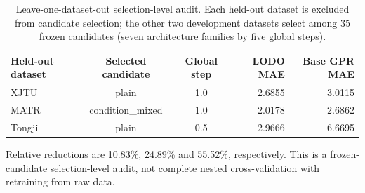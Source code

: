 \begin{table}[!htbp]
\centering
\caption{Leave-one-dataset-out selection-level audit. Each held-out dataset is excluded from candidate selection; the other two development datasets select among 35 frozen candidates (seven architecture families by five global steps).}
\label{tab:lodo}
\scriptsize
\setlength{\tabcolsep}{4pt}
\begin{tabular}{lccrr}
\toprule
Held-out dataset & Selected candidate & Global step & LODO MAE & Base GPR MAE \\
\midrule
XJTU & plain & 1.0 & 2.6855 & 3.0115 \\
MATR & condition\_mixed & 1.0 & 2.0178 & 2.6862 \\
Tongji & plain & 0.5 & 2.9666 & 6.6695 \\
\bottomrule
\end{tabular}
\begin{flushleft}
\scriptsize Relative reductions are 10.83\%, 24.89\% and 55.52\%, respectively. This is a frozen-candidate selection-level audit, not complete nested cross-validation with retraining from raw data.
\end{flushleft}
\end{table}
